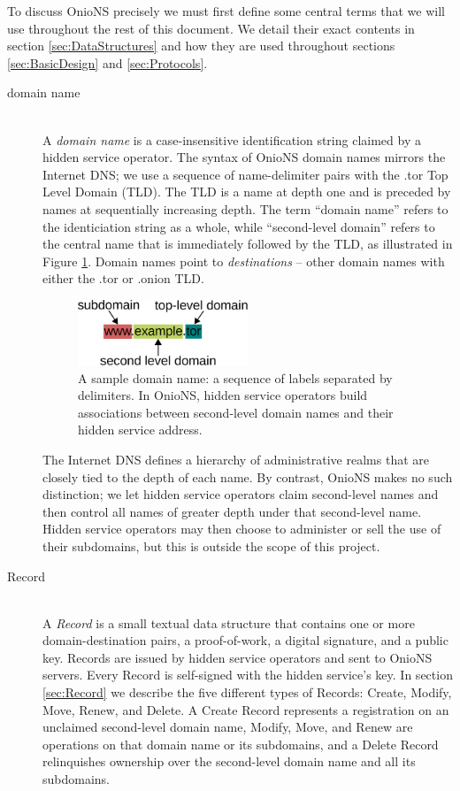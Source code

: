 To discuss OnioNS precisely we must first define some central terms that we will use throughout the rest of this document. We detail their exact contents in section \ref{sec:DataStructures} and how they are used throughout sections \ref{sec:BasicDesign} and \ref{sec:Protocols}.

\begin{description}
	\item[domain name] \hfill \\
		A \emph{domain name} is a case-insensitive identification string claimed by a hidden service operator. The syntax of OnioNS domain names mirrors the Internet DNS; we use a sequence of name-delimiter pairs with the .tor Top Level Domain (TLD). The TLD is a name at depth one and is preceded by names at sequentially increasing depth. The term ``domain name'' refers to the identiciation string as a whole, while ``second-level domain'' refers to the central name that is immediately followed by the TLD, as illustrated in Figure \ref{fig:sampleDomain}. Domain names point to \emph{destinations} -- other domain names with either the .tor or .onion TLD.

		\begin{figure}[htbp]
			\centering
			\includegraphics[width=0.5\textwidth]{images/domain-name.eps}
			\caption{A sample domain name: a sequence of labels separated by delimiters. In OnioNS, hidden service operators build associations between second-level domain names and their hidden service address.}
			\label{fig:sampleDomain}
		\end{figure}

	The Internet DNS defines a hierarchy of administrative realms that are closely tied to the depth of each name. By contrast, OnioNS makes no such distinction; we let hidden service operators claim second-level names and then control all names of greater depth under that second-level name. Hidden service operators may then choose to administer or sell the use of their subdomains, but this is outside the scope of this project.

	\item[Record] \hfill \\
		A \emph{Record} is a small textual data structure that contains one or more domain-destination pairs, a proof-of-work, a digital signature, and a public key. Records are issued by hidden service operators and sent to OnioNS servers. Every Record is self-signed with the hidden service's key. In section \ref{sec:Record} we describe the five different types of Records: Create, Modify, Move, Renew, and Delete. A Create Record represents a registration on an unclaimed second-level domain name, Modify, Move, and Renew are operations on that domain name or its subdomains, and a Delete Record relinquishes ownership over the second-level domain name and all its subdomains.


\end{description}
